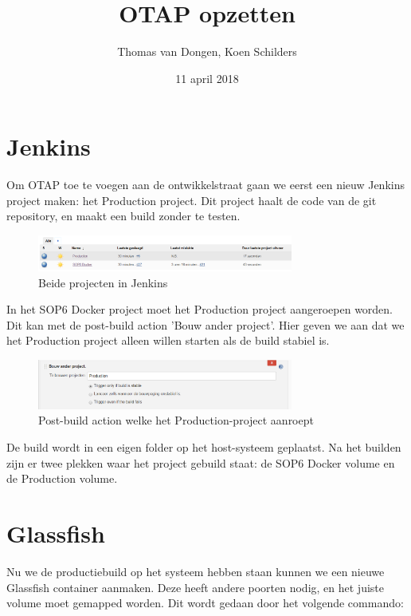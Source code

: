 \documentclass[12pt]{article}
\title{OTAP opzetten}
\author{Thomas van Dongen, Koen Schilders}
\date{11 april 2018}
\begin{document}
\begin{titlepage}
\maketitle
\end{titlepage}

\section{Jenkins}
Om OTAP toe te voegen aan de ontwikkelstraat gaan we eerst een nieuw Jenkins project maken: het Production project. Dit project haalt de code van de git repository, en maakt een build zonder te testen.

\begin{figure}[H]
	\begin{center}
		\includegraphics[width=0.75\textwidth]{images/jenkinsoverzicht.PNG}
		\caption{Beide projecten in Jenkins\label{fig:jenkinsoverzicht}}
	\end{center}
\end{figure}

In het SOP6 Docker project moet het Production project aangeroepen worden. Dit kan met de post-build action 'Bouw ander project'. Hier geven we aan dat we het Production project alleen willen starten als de build stabiel is.

\begin{figure}[H]
	\begin{center}
		\includegraphics[width=0.75\textwidth]{images/post-build.PNG}
		\caption{Post-build action welke het Production-project aanroept\label{fig:post-build}}
	\end{center}
\end{figure}

De build wordt in een eigen folder op het host-systeem geplaatst. Na het builden zijn er twee plekken waar het project gebuild staat: de SOP6 Docker volume en de Production volume.

\section{Glassfish}
Nu we de productiebuild op het systeem hebben staan kunnen we een nieuwe Glassfish container aanmaken. Deze heeft andere poorten nodig, en het juiste volume moet gemapped worden. Dit wordt gedaan door het volgende commando:
\newline
\end{document}

